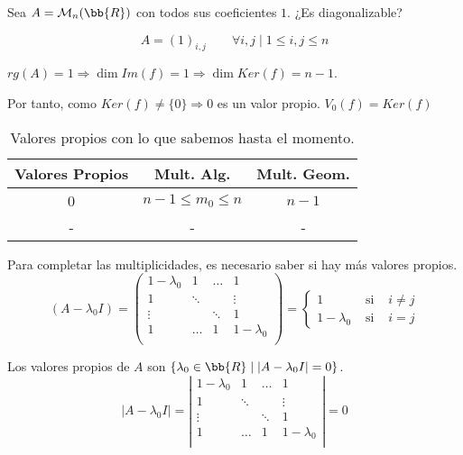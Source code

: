 \begin{ejercicio}\label{Ej:TodosUnos}
    Sea $A=\mathcal{M}_n(\bb{R})$ con todos sus coeficientes $1$. ¿Es diagonalizable?

    $$A = (1)_{i,j} \qquad \forall i,j\mid 1 \leq i,j \leq n$$

    $rg(A)=1 \Longrightarrow \dim Im(f) = 1 \Longrightarrow \dim Ker(f)=n-1$.
    
    Por tanto, como $Ker(f)\neq\{0\}\Longrightarrow 0$  es un valor propio. $V_0(f)=Ker(f)$

    \begin{table}[H]
        \centering
        \begin{tabular}{c|c|c}
            Valores Propios & Mult. Alg. & Mult. Geom. \\ \hline 
            0 & $n-1 \leq m_0 \leq n$ & $n-1$\\
            - & - & -\\
        \end{tabular}
        \caption{Valores propios con lo que sabemos hasta el momento.}
    \end{table}
    
    Para completar las multiplicidades, es necesario saber si hay más valores propios.
    \begin{equation*}
        (A-\lambda_0 I) = \left( \begin{array}{cccc}
            1-\lambda_0 & 1 & \dots & 1 \\
            1 & \ddots &  & \vdots \\
            \vdots &  & \ddots & 1 \\
            1 & \dots & 1 & 1-\lambda_0 \\
        \end{array}\right) = \left\{
        \begin{array}{ccc}
            1 & \text{ si } & i\neq j\\
            1-\lambda_0 & \text{ si } & i= j
        \end{array}
        \right.
    \end{equation*}

    Los valores propios de $A$ son $\{\lambda_0 \in \bb{R} \mid |A-\lambda_0 I| = 0\}$.
    \begin{equation*}
        |A-\lambda_0 I| = \left| \begin{array}{cccc}
            1-\lambda_0 & 1 & \dots & 1 \\
            1 & \ddots &  & \vdots \\
            \vdots &  & \ddots & 1 \\
            1 & \dots & 1 & 1-\lambda_0 \\
        \end{array}\right| = 0
    \end{equation*}


\end{ejercicio}
